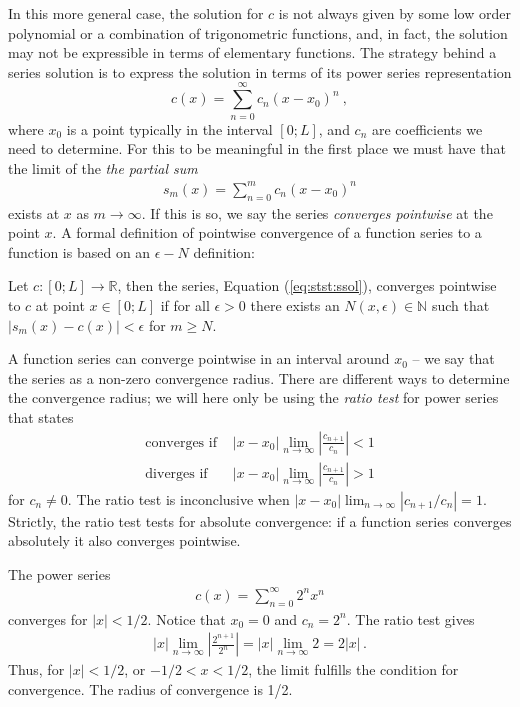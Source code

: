 In this more general case, the solution for $c$ is not always given by some low order polynomial or a
combination of trigonometric functions, and, in fact, the solution may not be expressible in 
terms of elementary functions. The strategy behind a series solution is to express 
the solution in terms of its power series representation 
\begin{equation}
	\label{eq:stst:ssol}
	c(x) = \sum_{n=0}^\infty c_n (x-x_0)^n \ , 
\end{equation}
where $x_0$ is a point typically in the interval $[0;L]$, and $c_n$ are coefficients we need to
determine.   For this to be meaningful in the first place we must have 
that the limit of the \emph{the partial sum} 
\begin{eqnarray}
	s_m(x) = \sum_{n=0}^m c_n (x-x_0)^n 
\end{eqnarray}
exists at $x$ as $m \rightarrow \infty$. If this is so, we say the series \emph{converges pointwise}
 at the point $x$. A formal definition of pointwise convergence of
a function series to a function is based on an $\epsilon-N$ definition:  
\begin{definition}
Let $c: [0; L] \rightarrow \mathbb{R}$, then the series, Equation (\ref{eq:stst:ssol}), 
converges pointwise to $c$ at point $x \in [0; L]$ if for all $\epsilon > 0$ 
	there exists an $N(x, \epsilon) \in \mathbb{N}$ such that $|s_m(x) - c(x)| < \epsilon$ for $m
	\geq N$. 
\end{definition}
\noindent A function series can converge pointwise in an interval around $x_0$ -- 
we say that the series as a non-zero convergence radius. There are different ways to determine 
the convergence radius; we will here only be using the \emph{ratio test} for power
series that states      
\begin{align}
	\label{eq:stst:ratiotest}
	\text{converges if }& |x-x_0| \lim_{n \rightarrow \infty} \left| \frac{c_{n+1}}{c_n} \right| < 1 
	 \nonumber \\ 
	\text{diverges if }& |x-x_0| \lim_{n \rightarrow \infty} \left| \frac{c_{n+1}}{c_n} \right|
	> 1 \nonumber 
\end{align}
for $c_n \neq 0$. The ratio test is inconclusive when $|x-x_0| \lim_{n \rightarrow \infty} \left|
c_{n+1}/c_n \right| = 1$. Strictly, the ratio test tests for absolute convergence: 
if a function series converges absolutely it also converges pointwise. 

\begin{example}\label{ex:stst:convseries}
	The power series 
	\begin{eqnarray}
		c(x) = \sum_{n=0}^\infty 2^n x^n 
	\end{eqnarray}
	converges for $|x| < 1/2$. Notice that $x_0=0$ and $c_n = 2^n$. The ratio test gives
	\begin{eqnarray}
		|x| \lim_{n \rightarrow \infty} \left| \frac{2^{n+1}}{2^n} \right| = 
		|x| \lim_{n \rightarrow \infty} 2  = 2 |x| \, . 
	\end{eqnarray}
	Thus, for $|x| < 1/2$, or $-1/2 < x < 1/2$, the limit fulfills the condition for convergence. 
	The radius of convergence is 1/2.  
\end{example}

